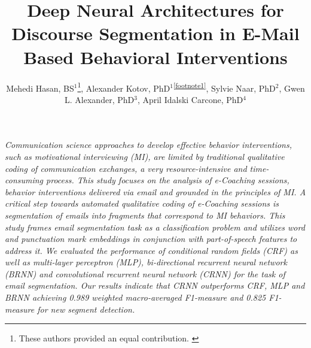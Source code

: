 \documentclass{amia}
\begin{document}
\title{Deep Neural Architectures for Discourse Segmentation in E-Mail Based Behavioral Interventions}

\author{Mehedi Hasan, BS$^{1}$\footnote{These authors provided an equal contribution. \label{footnote1}}, Alexander Kotov, PhD$^{1}$\textsuperscript{\ref{footnote1}}, Sylvie Naar, PhD$^{2}$, Gwen L. Alexander, PhD$^{3}$, April Idalski Carcone, PhD$^{4}$}


\maketitle

\textit{Communication science approaches to develop effective behavior interventions, such as motivational interviewing (MI), are limited by traditional qualitative coding of communication exchanges, a very resource-intensive and time-consuming process. This study focuses on the analysis of e-Coaching sessions, behavior interventions delivered via email and grounded in the principles of MI. A critical step towards automated qualitative coding of e-Coaching sessions is segmentation of emails into fragments that correspond to MI behaviors. This study frames email segmentation task as a classification problem and utilizes word and punctuation mark embeddings in conjunction with part-of-speech features to address it. We evaluated the performance of conditional random fields (CRF) as well as multi-layer perceptron (MLP), bi-directional recurrent neural network (BRNN) and convolutional recurrent neural network (CRNN) for the task of email segmentation. Our results indicate that CRNN outperforms CRF, MLP and BRNN achieving 0.989 weighted macro-averaged F1-measure and 0.825 F1-measure for new segment detection.}
\end{document}
